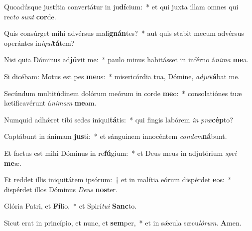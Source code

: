 \item Quoadúsque justítia convertátur in ju\textbf{dí}cium:~* et qui juxta illam omnes qui rec\textit{to} \textit{sunt} \textbf{cor}de.

\item Quis consúrget mihi advérsus mali\textbf{gnán}tes?~* aut quis stabit mecum advérsus operántes in\textit{i}\textit{qui}\textbf{tá}tem?

\item Nisi quia Dóminus ad\textbf{jú}vit me:~* paulo minus habitásset in inférno á\textit{ni}\textit{ma} \textbf{me}a.

\item Si dicébam: Motus est pes \textbf{me}us:~* misericórdia tua, Dómine, \textit{ad}\textit{ju}\textbf{vá}bat me.

\item Secúndum multitúdinem dolórum meórum in corde \textbf{me}o:~* consolatiónes tuæ lætificavérunt á\textit{ni}\textit{mam} \textbf{me}am.

\item Numquid adhǽret tibi sedes iniqui\textbf{tá}tis:~* qui fingis labórem \textit{in} \textit{præ}\textbf{cép}to?

\item Captábunt in ánimam \textbf{jus}ti:~* et sánguinem innocéntem \textit{con}\textit{dem}\textbf{ná}bunt.

\item Et factus est mihi Dóminus in re\textbf{fú}gium:~* et Deus meus in adjutórium \textit{spe}\textit{i} \textbf{me}æ.

\item Et reddet illis iniquitátem ipsórum:~† et in malítia eórum dispérdet \textbf{e}os:~* dispérdet illos Dóminus \textit{De}\textit{us} \textbf{nos}ter.

\item Glória Patri, et \textbf{Fí}lio,~* et Spirí\textit{tu}\textit{i} \textbf{Sanc}to.

\item Sicut erat in princípio, et nunc, et \textbf{sem}per,~* et in sǽcula sæcu\textit{ló}\textit{rum}. \textbf{A}men.
